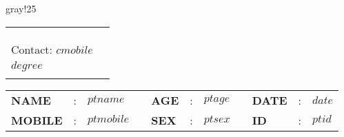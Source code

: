 \documentclass[12pt]{article}
\newcommand{\patientName}{$ ptname $}
\newcommand{\prescriptionID}{$ ptid $}
\begin{document}
\thispagestyle{plain}

\setlength{\columnsep}{0.3in}
\setcolumnwidth{4in, 4in}

\begin{colbackbox}{gray!25}
\begin{tabular}{l | l}
\multicolumn{2}{l}{}\\
\begin{minipage}{0.47\textwidth}
        \begin{flushleft}
            \onehalfspacing
            {\LARGE \textbf{Chamber:}} \\
            \textit{\textbf{$ cadd $ \\
            Contact: $ cmobile $} }
        \end{flushleft}
\end{minipage}
&
\begin{minipage}{0.47\textwidth}
        \begin{flushright}
             {\fontsize{13}{13}\selectfont\bf $ drname $}\\
             \vspace*{0.1in}
             {\fontsize{10}{10}\selectfont $ degree $}\\
        \end{flushright}
\end{minipage}
\vspace*{0.2in}
\end{tabular}
\end{colbackbox}

\setcolumnwidth{2in, 4in}
\vspace*{-0.5cm}
\noindent\textcolor{KUrod}{\makebox[\linewidth]{\rule{\paperwidth}{0.4pt}}}
\vspace*{0.05cm}
\begin{paracol}{2}
\centering
    \begin{table}
        \begin{tabular}{p{0.8in}p{0.05in}p{1.5in}p{0.1in}p{0.4in}p{0.05in}p{0.3in}p{0.1in}p{0.5in}p{0.05in}p{1.0in}}
            {\bf NAME}   & : & {\em \patientName}  &  & {\bf AGE}  & : & {\em $ ptage $}    &            & {\bf DATE} & : & {\em $ date $}         \\
            {\bf MOBILE} & : & {\em $ ptmobile $} &  & {\bf SEX} & : & {\em $ ptsex $} & & {\bf ID}  & : & {\em \prescriptionID}
        \end{tabular}
    \end{table}
\end{paracol}
\end{document}
